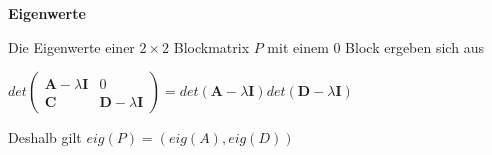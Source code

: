 {\textbf{Eigenwerte}\par\vskip1pt
Die Eigenwerte einer $2 \times 2$ Blockmatrix $P$ mit einem 0 Block ergeben sich aus\par\vspace{-4pt}
\begin{center}
$det\begin{pmatrix} \pmb A - \lambda\pmb I & 0\\ \pmb C & \pmb D - \lambda\pmb I\end{pmatrix} = det(\pmb A - \lambda\pmb I)det(\pmb D - \lambda\pmb I)$
\end{center}\par\vskip3pt

Deshalb gilt $eig(P) = (eig(A), eig(D))$

}
\WhiteSpace